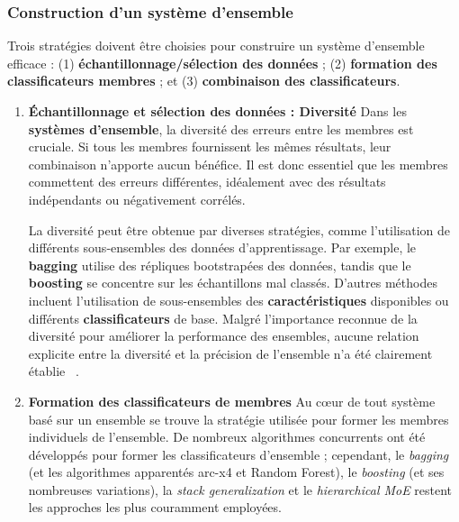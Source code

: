 \subsubsection{Construction d'un système d'ensemble}
Trois stratégies doivent être choisies pour construire un système d'ensemble efficace : (1) \textbf{échantillonnage/sélection des données} ; (2) \textbf{formation des classificateurs membres} ; et (3) \textbf{combinaison des classificateurs}.

\begin{enumerate}
	\item \textbf{Échantillonnage et sélection des données : Diversité}
	\qquad Dans les \textbf{systèmes d'ensemble}, la diversité des erreurs entre les membres est cruciale. Si tous les membres fournissent les mêmes résultats, leur combinaison n'apporte aucun bénéfice. Il est donc essentiel que les membres commettent des erreurs différentes, idéalement avec des résultats indépendants ou négativement corrélés.
	
	La diversité peut être obtenue par diverses stratégies, comme l'utilisation de différents sous-ensembles des données d'apprentissage. Par exemple, le \textbf{bagging} utilise des répliques bootstrapées des données, tandis que le \textbf{boosting} se concentre sur les échantillons mal classés. D'autres méthodes incluent l'utilisation de sous-ensembles des \textbf{caractéristiques} disponibles ou différents \textbf{classificateurs} de base. Malgré l'importance reconnue de la diversité pour améliorer la performance des ensembles, aucune relation explicite entre la diversité et la précision de l'ensemble n'a été clairement établie ~\cite{polikar2012ensemble}.
	
	\item \textbf{Formation des classificateurs de membres}
	\qquad Au cœur de tout système basé sur un ensemble se trouve la stratégie utilisée pour former les membres individuels de l'ensemble. De nombreux algorithmes concurrents ont été développés pour former les classificateurs d'ensemble ; cependant, le \textit{bagging} (et les algorithmes apparentés arc-x4 et Random Forest), le \textit{boosting} (et ses nombreuses variations), la \textit{stack generalization} et le \textit{hierarchical MoE} restent les approches les plus couramment employées.
	

\end{enumerate}
